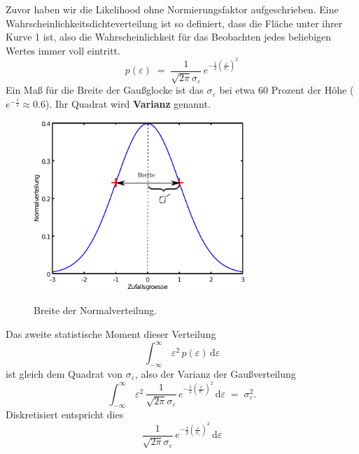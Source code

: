 Zuvor haben wir die Likelihood ohne Normierungsfaktor aufgeschrieben.
Eine Wahrscheinlichkeitsdichteverteilung ist so definiert, dass die Fläche unter ihrer Kurve 1 ist, also die Wahrscheinlichkeit
für das Beobachten jedes beliebigen Wertes immer voll eintritt.
\begin{equation}
p(\varepsilon) \; = \; \frac{1}{\sqrt{2 \pi} \sigma_{\varepsilon}} \, e^{-\frac{1}{2} \left(\frac{\varepsilon}{\sigma_{\varepsilon}}\right)^2}
\end{equation}
Ein Maß für die Breite der Gaußglocke ist das $\sigma_{\varepsilon}$ bei etwa 60 Prozent der Höhe ($e^{-\frac{1}{2}} \approx 0.6$).
Ihr Quadrat wird \textbf{Varianz} genannt.
\begin{figure}
\begin{center}
\includegraphics[width=80mm]{01_vorlesung/media/breite_norm_pdf.pdf}
\label{normpdf}
\caption{Breite der Normalverteilung.}
\end{center}
\end{figure}
Das zweite statistische Moment dieser Verteilung 
\begin{equation}
\int_{-\infty}^\infty \, \varepsilon^2 \, p(\varepsilon) \, \mathrm{d} \varepsilon 
\end{equation}
ist gleich dem Quadrat von $\sigma_\varepsilon$, also der Varianz der Gaußverteilung
\begin{equation}
\int_{-\infty}^\infty \, \varepsilon^2 \,  \frac{1}{\sqrt{2 \pi} \sigma_{\varepsilon}} \, e^{-\frac{1}{2} \left(\frac{\varepsilon}{\sigma_\varepsilon}\right)^2} \, \mathrm{d} \varepsilon  \; = \; \sigma_{\varepsilon}^2 .
\end{equation}
Diskretisiert entspricht dies
\begin{equation}
\frac{1}{\sqrt{2 \pi} \sigma_\varepsilon} \, e^{-\frac{1}{2} \left(\frac{\varepsilon}{\sigma_{\varepsilon}}\right)^2} \, \mathrm{d} \varepsilon
\end{equation}
